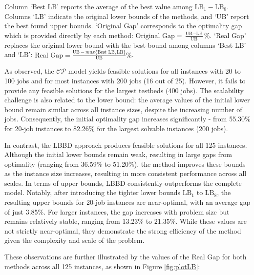 \documentclass[a4paper,final]{article}
\begin{document}
        Column `Best LB' reports the average of the best value among $\text{LB}_{1} - \text{LB}_{8}$. Columns `LB' indicate the original lower bounds of the methods, and `UB' report the best found upper bounds. `Original Gap' corresponds to the optimality gap which is provided directly by each method: $\text{Original Gap} = \frac{\text{UB} - \text{LB}}{\text{UB}}\%$. `Real Gap' replaces the original lower bound with the best bound among columns `Best LB' and `LB': $\text{Real Gap} = \frac{\text{UB} - max\{\text{Best LB}, \text{LB}\}}{\text{UB}}\%$.

        As observed, the $\mathcal{CP}$ model yields feasible solutions for all instances with 20 to 100 jobs and for most instances with 200 jobs (16 out of 25). However, it fails to provide any feasible solutions for the largest testbeds (400 jobs). The scalability challenge is also related to the lower bound: the average values of the initial lower bound remain similar across all instance sizes, despite the increasing number of jobs. Consequently, the initial optimality gap increases significantly - from 55.30\% for 20-job instances to 82.26\% for the largest solvable instances (200 jobs).

        In contrast, the LBBD approach produces feasible solutions for all 125 instances. Although the initial lower bounds remain weak, resulting in large gaps from optimality (ranging from 36.59\% to 51.20\%), the method improves these bounds as the instance size increases, resulting in more consistent performance across all scales. In terms of upper bounds, LBBD consistently outperforms the complete model. Notably, after introducing the tighter lower bounds $\text{LB}_{1}$ to $\text{LB}_{8}$, the resulting upper bounds for 20-job instances are near-optimal, with an average gap of just 3.85\%. For larger instances, the gap increases with problem size but remains relatively stable, ranging from 13.23\% to 21.35\%. While these values are not strictly near-optimal, they demonstrate the strong efficiency of the method given the complexity and scale of the problem.

        These observations are further illustrated by the values of the Real Gap for both methods across all 125 instances, as shown in Figure \ref{fig:plotLB}:
\end{document}
